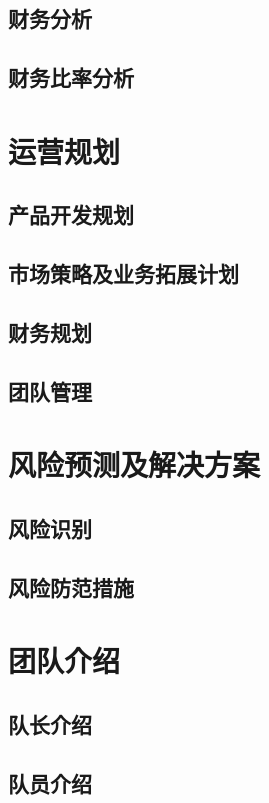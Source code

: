 \documentclass[a4paper]{ctexart}
\begin{document}
\subsection{财务分析}

\subsection{财务比率分析}

\section{运营规划}

\subsection{产品开发规划}

\subsection{市场策略及业务拓展计划}

\subsection{财务规划}

\subsection{团队管理}

\section{风险预测及解决方案}

\subsection{风险识别}

\subsection{风险防范措施}

\section{团队介绍}

\subsection{队长介绍}

\subsection{队员介绍}
\end{document}
